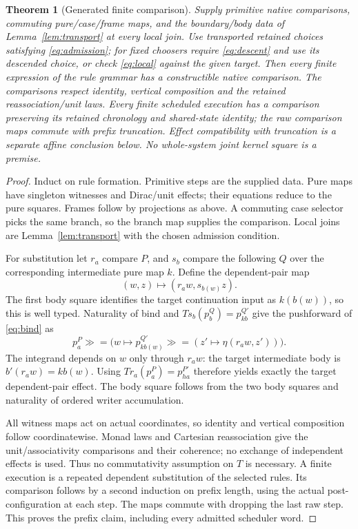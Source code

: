 \documentclass[11pt]{article}
\newtheorem{theorem}{Theorem}
\begin{document}
\begin{theorem}[Generated finite comparison]\label{thm:rules}
Supply primitive native comparisons, commuting pure/case/frame maps, and the boundary/body data of Lemma~\ref{lem:transport} at every local join. Use transported retained choices satisfying \eqref{eq:admission}; for fixed choosers require \eqref{eq:descent} and use its descended choice, or check \eqref{eq:local} against the given target. Then every finite expression of the rule grammar has a constructible native comparison. The comparisons respect identity, vertical composition and the retained reassociation/unit laws. Every finite scheduled execution has a comparison preserving its retained chronology and shared-state identity; the raw comparison maps commute with prefix truncation. Effect compatibility with truncation is a separate affine conclusion below. No whole-system joint kernel square is a premise.
\end{theorem}
\begin{proof}
Induct on rule formation. Primitive steps are the supplied data. Pure maps have singleton witnesses and Dirac/unit effects; their equations reduce to the pure squares. Frames follow by projections as above. A commuting case selector picks the same branch, so the branch map supplies the comparison. Local joins are Lemma~\ref{lem:transport} with the chosen admission condition.

For substitution let $r_a$ compare $P$, and $s_b$ compare the following $Q$ over the corresponding intermediate pure map $k$. Define the dependent-pair map
\[
 (w,z)\longmapsto (r_aw,s_{b(w)}z).
\]
The first body square identifies the target continuation input as $k(b(w))$, so this is well typed. Naturality of bind and $Ts_b(p_b^Q)=p_{kb}^{Q'}$ give the pushforward of \eqref{eq:bind} as
\[
 p^P_a\mathbin{\gg=}\bigl(w\mapsto p^{Q'}_{kb(w)}\mathbin{\gg=}(z'\mapsto\eta(r_aw,z'))\bigr).
\]
The integrand depends on $w$ only through $r_aw$: the target intermediate body is $b'(r_aw)=kb(w)$. Using $Tr_a(p^P_a)=p^{P'}_{ha}$ therefore yields exactly the target dependent-pair effect. The body square follows from the two body squares and naturality of ordered writer accumulation.

All witness maps act on actual coordinates, so identity and vertical composition follow coordinatewise. Monad laws and Cartesian reassociation give the unit/associativity comparisons and their coherence; no exchange of independent effects is used. Thus no commutativity assumption on $T$ is necessary. A finite execution is a repeated dependent substitution of the selected rules. Its comparison follows by a second induction on prefix length, using the actual post-configuration at each step. The maps commute with dropping the last raw step. This proves the prefix claim, including every admitted scheduler word.
\end{proof}
\end{document}
